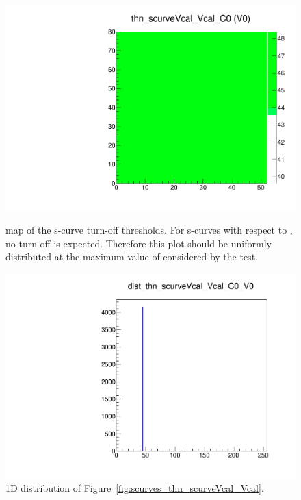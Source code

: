 \begin{figure}[!Hp]
\centering
\begin{minipage}{0.45\textwidth}
  \includegraphics[width=1.0\textwidth]{figures/scurves_thn_scurveVcal_Vcal.pdf}
  \caption{\roc map of the \vcal s-curve turn-off thresholds.  
  For s-curves with respect to \vcal, no turn off is expected.
  Therefore this plot should be uniformly distributed at the maximum value of \vcal considered by the test.}
  \label{fig:scurves_thn_scurveVcal_Vcal}
\end{minipage}
\hspace{0.3cm}
\begin{minipage}{0.45\textwidth}
  \includegraphics[width=1.0\textwidth]{figures/scurves_dist_thn_scurveVcal_Vcal.pdf}
  \caption{1D distribution of Figure~\ref{fig:scurves_thn_scurveVcal_Vcal}.}
  \label{fig:scurves_dist_thn_scurveVcal_Vcal}
\end{minipage}
\end{figure}


